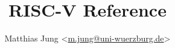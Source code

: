 
\renewcommand{\familydefault}{bch}


\newcommand{\instbit}[1]{\mbox{\scriptsize #1}}
\newcommand{\instbitrange}[2]{~\instbit{#1} \hfill \instbit{#2}~}


\newcommand{\headerfont}{\fontfamily{lmr}\selectfont}

\pretitle{\vspace{-0.75in}\begin{center} \huge \sffamily \bfseries}
\title{RISC-V Reference}
\posttitle{\end{center}}
\preauthor{\begin{center} \sffamily}
\author{Matthias Jung <\href{mailto:m.jung@uni-wuerzburg.de}{m.jung@uni-wuerzburg.de}>}
\postauthor{\end{center}}
\predate{}
\date{}
\postdate{}
